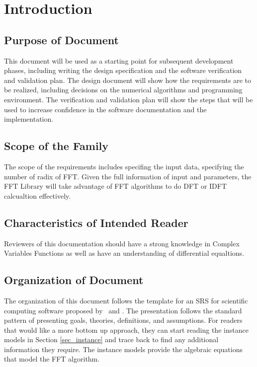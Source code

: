 \documentclass[12pt]{article}
\begin{document}
\section{Introduction}



\subsection{Purpose of Document}

This document will be  used as a starting point for subsequent development phases, including writing the design specification and the software verification and validation plan.
The design document will show how the requirements are to be realized, including decisions on the numerical algorithms and programming environment.
The verification and validation plan will show the steps that will be used to increase confidence in the software documentation and the implementation.


\subsection{Scope of the Family} 

The scope of the requirements includes specifing the input data, specifying the number of radix of FFT. Given the full information of input and parameters, the FFT Library will
take advantage of FFT algorithms to do DFT or IDFT calcualtion effectively.


\subsection{Characteristics of Intended Reader} 

Reviewers of this documentation should have a  strong knowledge in Complex Variables Functions as well as have an understanding of differential equaltions. 

\subsection{Organization of Document}
The organization of this document follows the template for an SRS for scientific
computing software proposed by~\cite{Koothoor2013} and \cite{SmithAndLai2005}.
The presentation follows the standard pattern of presenting goals, theories,
definitions, and assumptions.  For readers that would like a more bottom up
approach, they can start reading the instance models in Section
\ref{sec_instance} and trace back to find any additional information they
require.  The instance models provide the algebraic equations that model the FFT algorithm.
\end{document}
